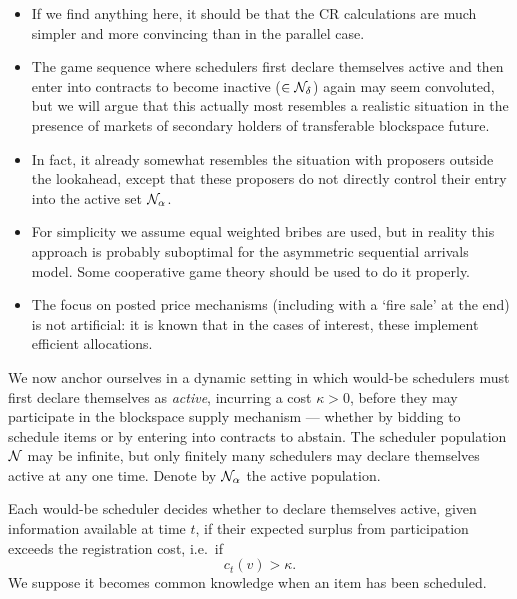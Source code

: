 \begin{itemize}
  \item 
    If we find anything here, it should be that the CR calculations are much simpler and more convincing than in the parallel case.
  \item
    The game sequence where schedulers first declare themselves active and then enter into contracts to become inactive ($\in\mathcal{N}_\delta$) again may seem convoluted, but we will argue that this actually most resembles a realistic situation in the presence of markets of secondary holders of transferable blockspace future.
  \item
    In fact, it already somewhat resembles the situation with proposers outside the lookahead, except that these proposers do not directly control their entry into the active set $\mathcal{N}_\alpha$.
  \item
    For simplicity we assume equal weighted bribes are used, but in reality this approach is probably suboptimal for the asymmetric sequential arrivals model.
    Some cooperative game theory should be used to do it properly.
  \item
    The focus on posted price mechanisms (including with a `fire sale' at the end) is not artificial: it is known that in the cases of interest, these implement efficient allocations.
\end{itemize}

We now anchor ourselves in a dynamic setting in which would-be schedulers must first declare themselves as \emph{active}, incurring a cost $\kappa>0$, before they may participate in the blockspace supply mechanism --- whether by bidding to schedule items or by entering into contracts to abstain.
%
The scheduler population $\mathcal{N}$ may be infinite, but only finitely many schedulers may declare themselves active at any one time.
%
Denote by $\mathcal{N}_\alpha$ the active population.

Each would-be scheduler decides whether to declare themselves active, given information available at time $t$, if their expected surplus from participation exceeds the registration cost, i.e.~if
\[
  c_t(v) > \kappa.
\]
We suppose it becomes common knowledge when an item has been scheduled.

